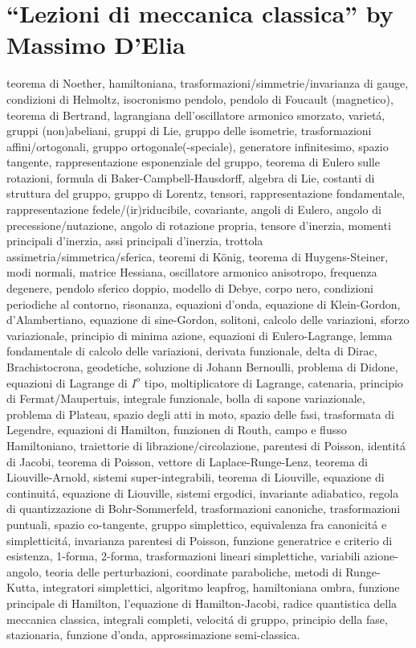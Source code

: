 

\usepackage[italian]{babel}




\section{``Lezioni di meccanica classica'' by Massimo D'Elia}
\begin{multicols}{3}
teorema di Noether,
hamiltoniana, trasformazioni/simmetrie/invarianza di gauge,
condizioni di Helmoltz, isocronismo pendolo, pendolo di Foucault (magnetico),
teorema di Bertrand, lagrangiana dell'oscillatore armonico smorzato, variet\'a,
gruppi (non)abeliani, gruppi di Lie, gruppo delle isometrie, trasformazioni
affini/ortogonali, gruppo ortogonale(-speciale), generatore infinitesimo,
spazio tangente, rappresentazione esponenziale del gruppo, teorema di Eulero
sulle rotazioni, formula di Baker-Campbell-Hausdorff, algebra di Lie, costanti
di struttura del gruppo, gruppo di Lorentz, tensori, rappresentazione
fondamentale, rappresentazione fedele/(ir)riducibile, covariante, angoli di
Eulero, angolo di precessione/nutazione, angolo di rotazione propria, tensore
d'inerzia, momenti principali d'inerzia, assi principali d'inerzia, trottola
assimetria/simmetrica/sferica, teoremi di K\"onig, teorema di Huygens-Steiner,
modi normali, matrice Hessiana, oscillatore armonico anisotropo, frequenza
degenere, pendolo sferico doppio, modello di Debye, corpo nero, condizioni
periodiche al contorno, risonanza, equazioni d'onda, equazione di Klein-Gordon,
d'Alambertiano,
equazione di sine-Gordon, solitoni, calcolo delle variazioni, sforzo
variazionale, principio di minima azione, equazioni di Eulero-Lagrange, lemma
fondamentale di calcolo delle variazioni, derivata funzionale, delta di Dirac,
Brachistocrona, geodetiche, soluzione di Johann Bernoulli, problema di Didone,
equazioni di Lagrange di $I^o$ tipo, moltiplicatore di Lagrange, catenaria,
principio di Fermat/Maupertuis, integrale funzionale, bolla di sapone
variazionale, problema di Plateau, spazio degli atti in moto, spazio delle
fasi, trasformata di Legendre, equazioni di Hamilton, funzionen di Routh, campo
e flusso Hamiltoniano, traiettorie di librazione/circolazione, parentesi di
Poisson, identit\'a di Jacobi,
teorema di Poisson, vettore di Laplace-Runge-Lenz, teorema di Liouville-Arnold,
sistemi super-integrabili, teorema di Liouville, equazione di continuit\'a,
equazione di Liouville, sistemi ergodici, invariante adiabatico, regola di
quantizzazione di Bohr-Sommerfeld, trasformazioni canoniche, trasformazioni puntuali, spazio
co-tangente, gruppo simplettico, equivalenza fra canonicit\'a e
simpletticit\'a, invarianza parentesi di Poisson, funzione generatrice e
criterio di esistenza, 1-forma, 2-forma, trasformazioni lineari simplettiche,
variabili azione-angolo, teoria delle perturbazioni, coordinate paraboliche,
metodi di Runge-Kutta, integratori simplettici, algoritmo leapfrog,
hamiltoniana ombra, funzione principale di Hamilton, l'equazione di
Hamilton-Jacobi, radice quantistica della meccanica classica, integrali
completi, velocit\'a di gruppo, principio della fase, stazionaria, funzione
d'onda, approssimazione semi-classica.
\end{multicols}

